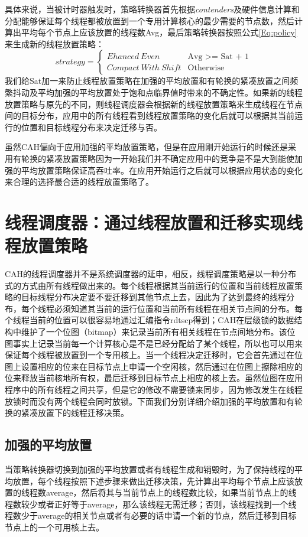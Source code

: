 具体来说，当被计时器触发时，策略转换器首先根据\emph{contenders}及硬件信息计算和分配能够保证每个线程都被放置到一个专用计算核心的最少需要的节点数，然后计算出平均每个节点上应该放置的线程数Avg，最后策略转换器按照公式\ref{Eq:policy}来生成新的线程放置策略：
\begin{equation}\label{Eq:policy}
strategy=
\begin{cases}
Ehanced\ Even &\text{Avg >=  Sat  + 1}\\
Compact\  With\  Shift &\text{Otherwise}
\end{cases}
\end{equation}
我们给Sat加一来防止线程放置策略在加强的平均放置和有轮换的紧凑放置之间频繁抖动及平均加强的平均放置处于饱和点临界值时带来的不确定性。如果新的线程放置策略与原先的不同，则线程调度器会根据新的线程放置策略来生成线程在节点间的目标分布，应用中的所有线程看到线程放置策略的变化后就可以根据其当前运行的位置和目标线程分布来决定迁移与否。

虽然CAH偏向于应用加强的平均放置策略，但是在应用刚开始运行的时候还是采用有轮换的紧凑放置策略因为一开始我们并不确定应用中的竞争是不是大到能使加强的平均放置策略保证高吞吐率。在应用开始运行之后就可以根据应用状态的变化来合理的选择最合适的线程放置策略了。

\section{线程调度器：通过线程放置和迁移实现线程放置策略}
CAH的线程调度器并不是系统调度器的延申，相反，线程调度策略是以一种分布式的方式由所有线程做出来的。每个线程根据其当前运行的位置和当前线程放置策略的目标线程分布决定要不要迁移到其他节点上去，因此为了达到最终的线程分布，每个线程必须知道其当前的运行位置和当前所有线程在相关节点间的分布。每个线程当前的位置可以很容易地通过汇编指令rdtscp得到；CAH在层级锁的数据结构中维护了一个位图（bitmap）来记录当前所有相关线程在节点间地分布。该位图事实上记录当前每一个计算核心是不是已经分配给了某个线程，所以也可以用来保证每个线程被放置到一个专用核上。当一个线程决定迁移时，它会首先通过在位图上设置相应的位来在目标节点上申请一个空闲核，然后通过在位图上擦除相应的位来释放当前核地所有权，最后迁移到目标节点上相应的核上去。虽然位图在应用程序中的所有线程之间共享，但是它的修改不需要锁来同步，因为修改发生在线程放锁时而没有两个线程会同时放锁。下面我们分别详细介绍加强的平均放置和有轮换的紧凑放置下的线程迁移决策。

\subsection{加强的平均放置}
当策略转换器切换到加强的平均放置或者有线程生成和销毁时，为了保持线程的平均放置，每个线程按照下述步骤来做出迁移决策，先计算出平均每个节点上应该放置的线程数average，然后将其与当前节点上的线程数比较，如果当前节点上的线程数较少或者正好等于average，那么该线程无需迁移；否则，该线程找到一个线程数少于average的相关节点或者有必要的话申请一个新的节点，然后迁移到目标节点上的一个可用核上去。

